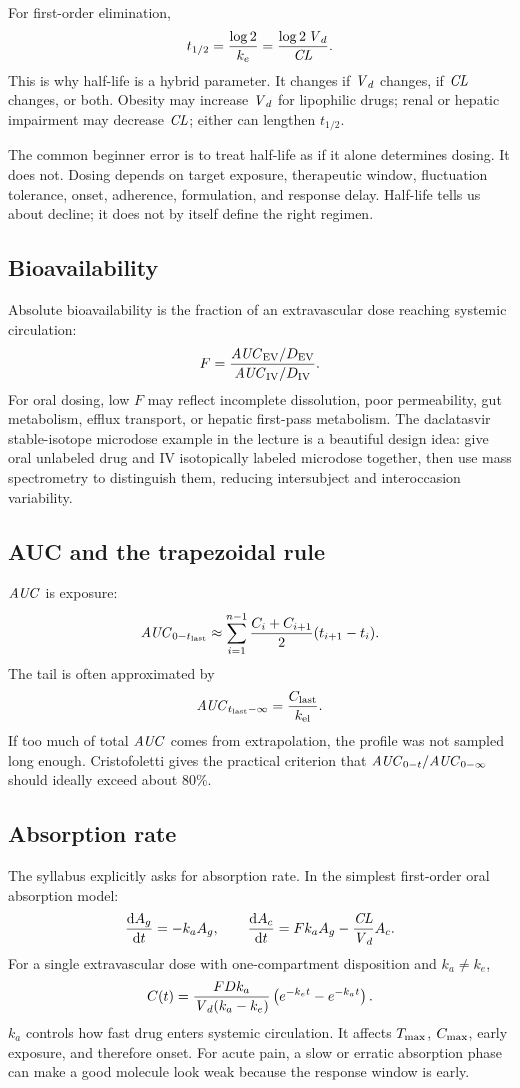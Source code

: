 \documentclass[a4paper]{article}
\newcommand{\CL}{\ensuremath{\pksym{CL}}}
\newcommand{\Vd}{\ensuremath{\pksym{V}_d}}
\newcommand{\AUC}{\ensuremath{\pksym{AUC}}}
\newcommand{\Cmax}{\ensuremath{C_{\pklab{max}}}}
\newcommand{\Tmax}{\ensuremath{T_{\pklab{max}}}}
\newcommand{\ka}{\ensuremath{k_a}}
\newcommand{\ke}{\ensuremath{k_e}}
\newcommand{\kel}{\ensuremath{k_{\pklab{el}}}}
\newcommand{\Fbio}{\ensuremath{F}}
\begin{document}
For first-order elimination,
\[
  t_{1/2}=\frac{\log 2}{\ke}
  =
  \frac{\log 2\,\Vd}{\CL}.
\]
This is why half-life is a hybrid parameter. It changes if \Vd{} changes, if \CL{} changes, or both. Obesity may increase \Vd{} for lipophilic drugs; renal or hepatic impairment may decrease \CL; either can lengthen \(t_{1/2}\).

The common beginner error is to treat half-life as if it alone determines dosing. It does not. Dosing depends on target exposure, therapeutic window, fluctuation tolerance, onset, adherence, formulation, and response delay. Half-life tells us about decline; it does not by itself define the right regimen.

\subsection{Bioavailability}

Absolute bioavailability is the fraction of an extravascular dose reaching systemic circulation:
\[
  \Fbio{}
  =
  \frac{\AUC_{\pklab{EV}}/D_{\pklab{EV}}}
       {\AUC_{\pklab{IV}}/D_{\pklab{IV}}}.
\]
For oral dosing, low \Fbio{} may reflect incomplete dissolution, poor permeability, gut metabolism, efflux transport, or hepatic first-pass metabolism. The daclatasvir stable-isotope microdose example in the lecture is a beautiful design idea: give oral unlabeled drug and IV isotopically labeled microdose together, then use mass spectrometry to distinguish them, reducing intersubject and interoccasion variability.

\subsection{AUC and the trapezoidal rule}

\(\AUC\) is exposure:
\[
  \AUC_{0-t_{\pklab{last}}}
  \approx
  \sum_{i=1}^{n-1}
  \frac{C_i+C_{i+1}}{2}(t_{i+1}-t_i).
\]
The tail is often approximated by
\[
  \AUC_{t_{\pklab{last}}-\infty}
  =
  \frac{C_{\pklab{last}}}{\kel}.
\]
If too much of total \(\AUC\) comes from extrapolation, the profile was not sampled long enough. Cristofoletti gives the practical criterion that \(\AUC_{0-t}/\AUC_{0-\infty}\) should ideally exceed about 80\%.

\subsection{Absorption rate}

The syllabus explicitly asks for absorption rate. In the simplest first-order oral absorption model:
\[
  \frac{\dd A_g}{\dd t}=-\ka{} A_g,
  \qquad
  \frac{\dd A_c}{\dd t}=\Fbio\ka{} A_g-\frac{\CL}{\Vd}A_c.
\]
For a single extravascular dose with one-compartment disposition and \(\ka\ne \ke\),
\[
  C(t)
  =
  \frac{\Fbio{} D\ka}{\Vd(\ka-\ke)}
  \left(e^{-\ke{} t}-e^{-\ka{} t}\right).
\]
\(\ka\) controls how fast drug enters systemic circulation. It affects \(\Tmax\), \(\Cmax\), early exposure, and therefore onset. For acute pain, a slow or erratic absorption phase can make a good molecule look weak because the response window is early.
\end{document}
